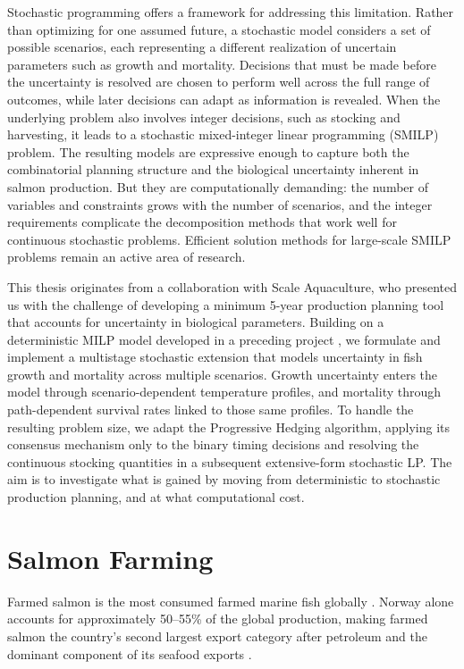 \documentclass[12pt,a4paper]{article}
\begin{document}
Stochastic programming offers a framework for addressing this limitation. Rather than optimizing for one assumed future, a stochastic model considers a set of possible scenarios, each representing a different realization of uncertain parameters such as growth and mortality. Decisions that must be made before the uncertainty is resolved are chosen to perform well across the full range of outcomes, while later decisions can adapt as information is revealed. When the underlying problem also involves integer decisions, such as stocking and harvesting, it leads to a stochastic mixed-integer linear programming (SMILP) problem. The resulting models are expressive enough to capture both the combinatorial planning structure and the biological uncertainty inherent in salmon production. But they are computationally demanding: the number of variables and constraints grows with the number of scenarios, and the integer requirements complicate the decomposition methods that work well for continuous stochastic problems. Efficient solution methods for large-scale SMILP problems remain an active area of research.
 
This thesis originates from a collaboration with Scale Aquaculture, who presented us with the challenge of developing a minimum 5-year production planning tool that accounts for uncertainty in biological parameters. Building on a deterministic MILP model developed in a preceding project \citep{ErikstadHaugland2025}, we formulate and implement a multistage stochastic extension that models uncertainty in fish growth and mortality across multiple scenarios. Growth uncertainty enters the model through scenario-dependent temperature profiles, and mortality through path-dependent survival rates linked to those same profiles. To handle the resulting problem size, we adapt the Progressive Hedging algorithm, applying its consensus mechanism only to the binary timing decisions and resolving the continuous stocking quantities in a subsequent extensive-form stochastic LP. The aim is to investigate what is gained by moving from deterministic to stochastic production planning, and at what computational cost.
 
\section{Salmon Farming}
\label{sec:salmonfarming}
 
Farmed salmon is the most consumed farmed marine fish globally \citep{FAO2020, mowi2025}. Norway alone accounts for approximately 50--55\% of the global production, making farmed salmon the country's second largest export category after petroleum and the dominant component of its seafood exports \citep{ssb2026}.
 
\end{document}
